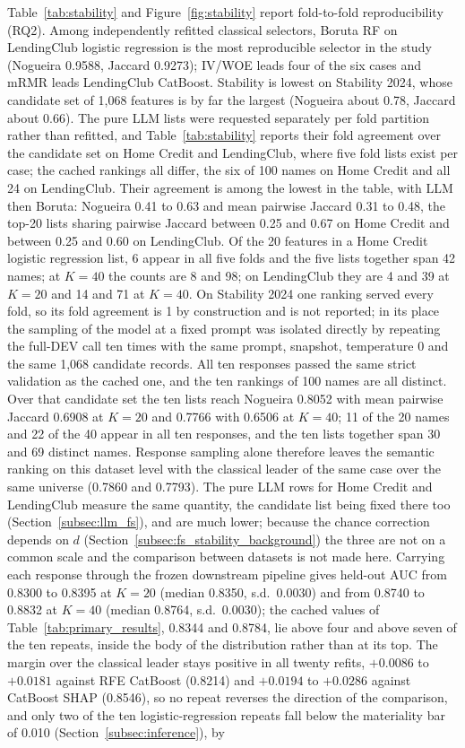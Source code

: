 \documentclass[final,5p,twocolumn]{elsarticle}
\newcommand{\Kfeat}{K}
\begin{document}
Table~\ref{tab:stability} and Figure~\ref{fig:stability} report fold-to-fold reproducibility (RQ2). Among independently refitted classical selectors, Boruta RF on LendingClub logistic regression is the most reproducible selector in the study (Nogueira 0.9588, Jaccard 0.9273); IV/WOE leads four of the six cases and mRMR leads LendingClub CatBoost. Stability is lowest on Stability 2024, whose candidate set of 1,068 features is by far the largest (Nogueira about 0.78, Jaccard about 0.66). The pure LLM lists were requested separately per fold partition rather than refitted, and Table~\ref{tab:stability} reports their fold agreement over the candidate set on Home Credit and LendingClub, where five fold lists exist per case; the cached rankings all differ, the six of 100 names on Home Credit and all 24 on LendingClub. Their agreement is among the lowest in the table, with LLM then Boruta: Nogueira 0.41 to 0.63 and mean pairwise Jaccard 0.31 to 0.48, the top-20 lists sharing pairwise Jaccard between 0.25 and 0.67 on Home Credit and between 0.25 and 0.60 on LendingClub. Of the 20 features in a Home Credit logistic regression list, 6 appear in all five folds and the five lists together span 42 names; at $\Kfeat=40$ the counts are 8 and 98; on LendingClub they are 4 and 39 at $\Kfeat=20$ and 14 and 71 at $\Kfeat=40$. On Stability 2024 one ranking served every fold, so its fold agreement is 1 by construction and is not reported; in its place the sampling of the model at a fixed prompt was isolated directly by repeating the full-DEV call ten times with the same prompt, snapshot, temperature 0 and the same 1,068 candidate records. All ten responses passed the same strict validation as the cached one, and the ten rankings of 100 names are all distinct. Over that candidate set the ten lists reach Nogueira 0.8052 with mean pairwise Jaccard 0.6908 at $\Kfeat=20$ and 0.7766 with 0.6506 at $\Kfeat=40$; 11 of the 20 names and 22 of the 40 appear in all ten responses, and the ten lists together span 30 and 69 distinct names. Response sampling alone therefore leaves the semantic ranking on this dataset level with the classical leader of the same case over the same universe (0.7860 and 0.7793). The pure LLM rows for Home Credit and LendingClub measure the same quantity, the candidate list being fixed there too (Section~\ref{subsec:llm_fs}), and are much lower; because the chance correction depends on $d$ (Section~\ref{subsec:fs_stability_background}) the three are not on a common scale and the comparison between datasets is not made here. Carrying each response through the frozen downstream pipeline gives held-out AUC from 0.8300 to 0.8395 at $\Kfeat=20$ (median 0.8350, s.d.\ 0.0030) and from 0.8740 to 0.8832 at $\Kfeat=40$ (median 0.8764, s.d.\ 0.0030); the cached values of Table~\ref{tab:primary_results}, 0.8344 and 0.8784, lie above four and above seven of the ten repeats, inside the body of the distribution rather than at its top. The margin over the classical leader stays positive in all twenty refits, $+0.0086$ to $+0.0181$ against RFE CatBoost (0.8214) and $+0.0194$ to $+0.0286$ against CatBoost SHAP (0.8546), so no repeat reverses the direction of the comparison, and only two of the ten logistic-regression repeats fall below the materiality bar of 0.010 (Section~\ref{subsec:inference}), by 
\end{document}
